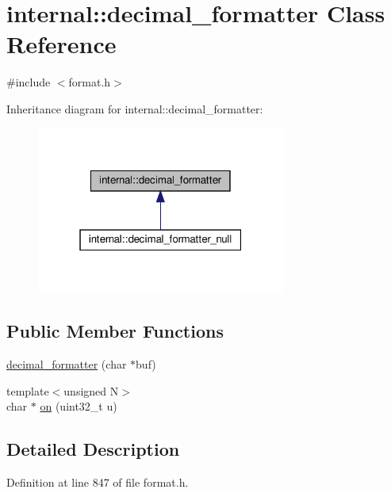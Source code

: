 \hypertarget{classinternal_1_1decimal__formatter}{}\section{internal\+:\+:decimal\+\_\+formatter Class Reference}
\label{classinternal_1_1decimal__formatter}


{\ttfamily \#include $<$format.\+h$>$}



Inheritance diagram for internal\+:\+:decimal\+\_\+formatter\+:
\nopagebreak
\begin{figure}[H]
\begin{center}
\leavevmode
\includegraphics[width=232pt]{classinternal_1_1decimal__formatter__inherit__graph}
\end{center}
\end{figure}
\subsection*{Public Member Functions}
\begin{DoxyCompactItemize}
\item 
\hyperlink{classinternal_1_1decimal__formatter_abcc6a834db70cc360ccb71c4c4c0e3c3}{decimal\+\_\+formatter} (char $\ast$buf)
\item 
{\footnotesize template$<$unsigned N$>$ }\\char $\ast$ \hyperlink{classinternal_1_1decimal__formatter_af97e1e296d5f7e562ee4c93cb8ea57a6}{on} (uint32\+\_\+t u)
\end{DoxyCompactItemize}


\subsection{Detailed Description}


Definition at line 847 of file format.\+h.



